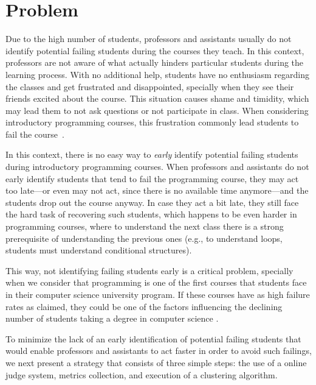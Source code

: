 \section{Problem}

\label{sec:problem}

Due to the high number of students, professors and assistants usually do not identify potential failing students during the courses they teach. In this context, professors are not aware of what actually hinders particular students during the learning process. With no additional help, students have no enthusiasm regarding the classes and get frustrated and disappointed, specially when they see their friends excited about the course. This situation causes shame and timidity, which may lead them to not ask questions or not participate in class. When considering introductory programming courses, this frustration commonly lead students to fail the course~\cite{}.

In this context, there is no easy way to \textit{early} identify potential failing students during introductory programming courses. When professors and assistants do not early identify students that tend to fail the programming course, they may act too late---or even may not act, since there is no available time anymore---and the students drop out the course anyway. In case they act a bit late, they still face the hard task of recovering such students, which happens to be even harder in programming courses, where to understand the next class there is a strong prerequisite of understanding the previous ones (e.g., to understand loops, students must understand conditional structures).

This way, not identifying failing students early is a critical problem, specially when we consider that programming is one of the first courses that students face in their computer science university program. If these courses have as high failure rates as claimed, they could be one of the factors influencing the declining number of students taking a degree in computer science \cite{bennedsen-sigcse}.

To minimize the lack of an early identification of potential failing students that would enable professors and assistants to act faster in order to avoid such failings, we next present a strategy that consists of three simple steps: the use of a online judge system, metrics collection, and execution of a clustering algorithm.